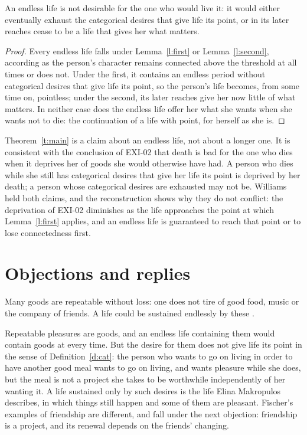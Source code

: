\documentclass{situationist-preprint}
\begin{document}
\begin{theorem}\label{t:main}
An endless life is not desirable for the one who would live it: it would either eventually exhaust the categorical desires that give life its point, or in its later reaches cease to be a life that gives her what matters.
\end{theorem}

\begin{proof}
Every endless life falls under Lemma~\ref{l:first} or Lemma~\ref{l:second}, according as the person's character remains connected above the threshold at all times or does not. Under the first, it contains an endless period without categorical desires that give life its point, so the person's life becomes, from some time on, pointless; under the second, its later reaches give her now little of what matters. In neither case does the endless life offer her what she wants when she wants not to die: the continuation of a life with point, for herself as she is.
\end{proof}

Theorem~\ref{t:main} is a claim about an endless life, not about a longer one. It is consistent with the conclusion of EXI-02 that death is bad for the one who dies when it deprives her of goods she would otherwise have had. A person who dies while she still has categorical desires that give her life its point is deprived by her death; a person whose categorical desires are exhausted may not be. Williams held both claims, and the reconstruction shows why they do not conflict: the deprivation of EXI-02 diminishes as the life approaches the point at which Lemma~\ref{l:first} applies, and an endless life is guaranteed to reach that point or to lose connectedness first.

\section{Objections and replies}\label{s:obj}

\begin{objection}\label{o:fischer}
Many goods are repeatable without loss: one does not tire of good food, music or the company of friends. A life could be sustained endlessly by these \citep{Fischer1994}.
\end{objection}

\begin{reply}
Repeatable pleasures are goods, and an endless life containing them would contain goods at every time. But the desire for them does not give life its point in the sense of Definition~\ref{d:cat}: the person who wants to go on living in order to have another good meal wants to go on living, and wants pleasure while she does, but the meal is not a project she takes to be worthwhile independently of her wanting it. A life sustained only by such desires is the life Elina Makropulos describes, in which things still happen and some of them are pleasant. Fischer's examples of friendship are different, and fall under the next objection: friendship is a project, and its renewal depends on the friends' changing.
\end{reply}
\end{document}

